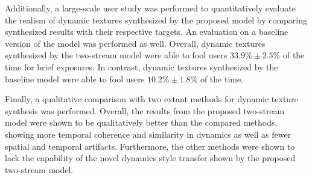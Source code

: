 Additionally, a large-scale user study was performed to quantitatively evaluate the realism of dynamic textures synthesized by the proposed model by comparing synthesized results with their respective targets. An evaluation on a baseline version of the model was performed as well. Overall, dynamic textures synthesized by the two-stream model were able to fool users $33.9\% \pm 2.5\%$ of the time for brief exposures. In contrast, dynamic textures synthesized by the baseline model were able to fool users $10.2\% \pm 1.8\%$ of the time.

Finally, a qualitative comparison with two extant methods for dynamic texture synthesis was performed. Overall, the results from the proposed two-stream model were shown to be qualitatively better than the compared methods, showing more temporal coherence and similarity in dynamics as well as fewer spatial and temporal artifacts. Furthermore, the other methods were shown to lack the capability of the novel dynamics style transfer shown by the proposed two-stream model.

